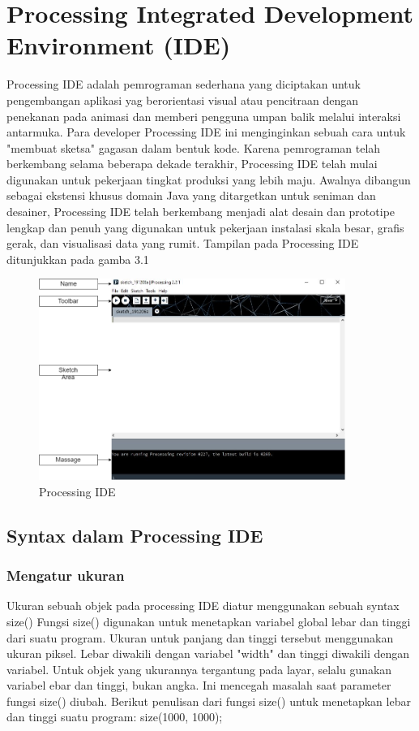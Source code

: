 \section{Processing Integrated Development Environment (IDE)}
Processing IDE adalah pemrograman sederhana yang diciptakan untuk pengembangan aplikasi yag berorientasi visual atau pencitraan dengan penekanan pada animasi dan memberi pengguna umpan balik melalui interaksi antarmuka. Para developer Processing IDE ini menginginkan sebuah cara untuk "membuat sketsa" gagasan dalam bentuk kode. Karena pemrograman telah berkembang selama beberapa dekade terakhir, Processing IDE telah mulai digunakan untuk pekerjaan tingkat produksi yang lebih maju. Awalnya dibangun sebagai ekstensi khusus domain Java yang ditargetkan untuk seniman dan desainer, Processing IDE telah berkembang menjadi alat desain dan prototipe lengkap dan penuh yang digunakan untuk pekerjaan instalasi skala besar, grafis gerak, dan visualisasi data yang rumit. Tampilan pada Processing IDE ditunjukkan pada gamba 3.1
	\begin{figure}[H]
	\centering
	\includegraphics[width=10cm]{gambar/processing_view.png}
	\caption{Processing IDE}
\end{figure}


\subsection{Syntax dalam Processing IDE }

\subsubsection{Mengatur ukuran}
Ukuran sebuah objek pada processing IDE diatur menggunakan sebuah syntax size() Fungsi size() digunakan untuk menetapkan variabel global lebar dan tinggi dari suatu program. Ukuran untuk panjang dan tinggi tersebut menggunakan ukuran piksel. Lebar diwakili dengan variabel "width" dan tinggi diwakili dengan variabel. Untuk objek yang ukurannya tergantung pada layar, selalu gunakan variabel ebar dan tinggi, bukan angka. Ini mencegah masalah saat parameter fungsi size() diubah. Berikut penulisan dari fungsi size() untuk menetapkan lebar dan tinggi suatu program:  size(1000, 1000); 


